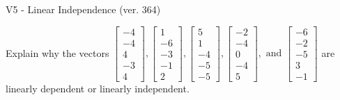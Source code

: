 \begin{exercise}
  \begin{exerciseTitle}V5 - Linear Independence (ver. 364)\end{exerciseTitle}
  \begin{exerciseStatement}
    Explain why the vectors \(\left[\begin{array}{r}
-4 \\
-4 \\
4 \\
-3 \\
4
\end{array}\right] , \left[\begin{array}{r}
1 \\
-6 \\
-3 \\
-1 \\
2
\end{array}\right] , \left[\begin{array}{r}
5 \\
1 \\
-4 \\
-5 \\
-5
\end{array}\right] , \left[\begin{array}{r}
-2 \\
-4 \\
0 \\
-4 \\
5
\end{array}\right] , \text{ and } \left[\begin{array}{r}
-6 \\
-2 \\
-5 \\
3 \\
-1
\end{array}\right]\) are linearly dependent or linearly independent.	



\end{exerciseStatement}
\end{exercise}
